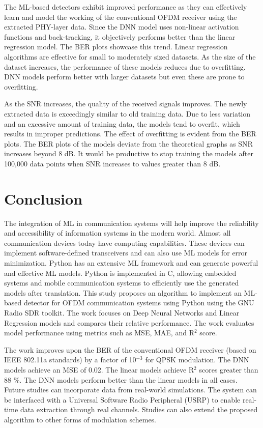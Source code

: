 \documentclass[conference]{IEEEtran}
\begin{document}
The ML-based detectors exhibit improved performance as they can effectively learn and model the working of the conventional OFDM receiver using the extracted PHY-layer data. Since the DNN model uses non-linear activation functions and back-tracking, it objectively performs better than the linear regression model. The BER plots showcase this trend. Linear regression algorithms are effective for small to moderately sized datasets. As the size of the dataset increases, the performance of these models reduces due to overfitting. DNN models perform better with larger datasets but even these are prone to overfitting.

As the SNR increases, the quality of the received signals improves. The newly extracted data is exceedingly similar to old training data. Due to less variation and an excessive amount of training data, the models tend to overfit, which results in improper predictions. The effect of overfitting is evident from the BER plots. The BER plots of the models deviate from the theoretical graphs as SNR increases beyond 8 dB. It would be productive to stop training the models after 100,000 data points when SNR increases to values greater than 8 dB.

\section{Conclusion}
The integration of ML in communication systems will help improve the reliability and accessibility of information systems in the modern world. Almost all communication devices today have computing capabilities. These devices can implement software-defined transceivers and can also use ML models for error minimization. Python has an extensive ML framework and can generate powerful and effective ML models. Python is implemented in C, allowing embedded systems and mobile communication systems to efficiently use the generated models after translation. This study proposes an algorithm to implement an ML-based detector for OFDM communication systems using Python using the GNU Radio SDR toolkit. The work focuses on Deep Neural Networks and Linear Regression models and compares their relative performance. The work evaluates model performance using metrics such as MSE, MAE, and R$^{2}$ score. 

The work improves upon the BER of the conventional OFDM receiver (based on IEEE 802.11a standards) by a factor of 10$^{-3}$ for QPSK modulation. The DNN models achieve an MSE of 0.02. The linear models achieve R$^{2}$ scores greater than 88 \%. The DNN models perform better than the linear models in all cases. Future studies can incorporate data from real-world simulations. The system can be interfaced with a Universal Software Radio Peripheral (USRP) to enable real-time data extraction through real channels. Studies can also extend the proposed algorithm to other forms of modulation schemes.
\end{document}
